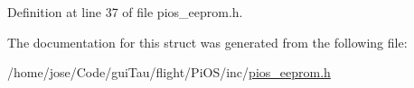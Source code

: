 Definition at line 37 of file pios\-\_\-eeprom.\-h.



The documentation for this struct was generated from the following file\-:\begin{DoxyCompactItemize}
\item 
/home/jose/\-Code/gui\-Tau/flight/\-Pi\-O\-S/inc/\hyperlink{pios__eeprom_8h}{pios\-\_\-eeprom.\-h}\end{DoxyCompactItemize}
